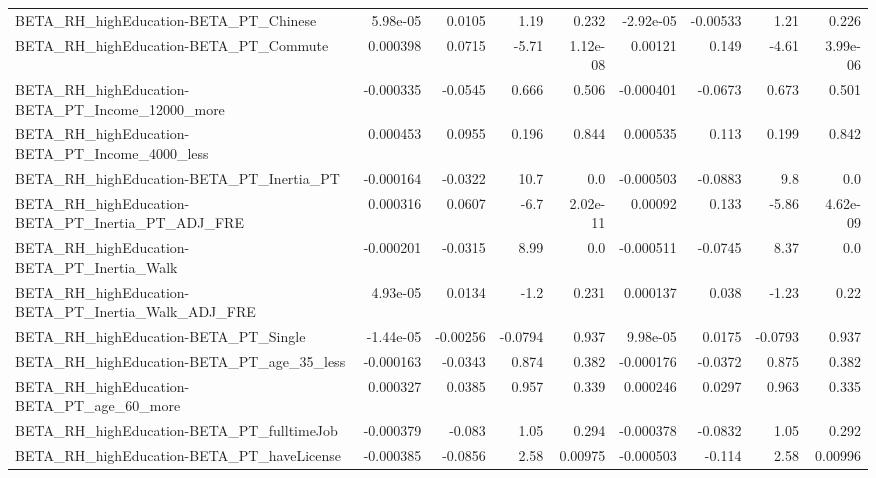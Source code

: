 \begin{tabular}{lrrrrrrrr}
BETA\_RH\_highEducation-BETA\_PT\_Chinese              &    5.98e-05 &       0.0105 &     1.19 &    0.232 &  -2.92e-05 &    -0.00533 &         1.21 &         0.226 \\
BETA\_RH\_highEducation-BETA\_PT\_Commute              &    0.000398 &       0.0715 &    -5.71 & 1.12e-08 &    0.00121 &       0.149 &        -4.61 &      3.99e-06 \\
BETA\_RH\_highEducation-BETA\_PT\_Income\_12000\_more    &   -0.000335 &      -0.0545 &    0.666 &    0.506 &  -0.000401 &     -0.0673 &        0.673 &         0.501 \\
BETA\_RH\_highEducation-BETA\_PT\_Income\_4000\_less     &    0.000453 &       0.0955 &    0.196 &    0.844 &   0.000535 &       0.113 &        0.199 &         0.842 \\
BETA\_RH\_highEducation-BETA\_PT\_Inertia\_PT           &   -0.000164 &      -0.0322 &     10.7 &      0.0 &  -0.000503 &     -0.0883 &          9.8 &           0.0 \\
BETA\_RH\_highEducation-BETA\_PT\_Inertia\_PT\_ADJ\_FRE   &    0.000316 &       0.0607 &     -6.7 & 2.02e-11 &    0.00092 &       0.133 &        -5.86 &      4.62e-09 \\
BETA\_RH\_highEducation-BETA\_PT\_Inertia\_Walk         &   -0.000201 &      -0.0315 &     8.99 &      0.0 &  -0.000511 &     -0.0745 &         8.37 &           0.0 \\
BETA\_RH\_highEducation-BETA\_PT\_Inertia\_Walk\_ADJ\_FRE &    4.93e-05 &       0.0134 &     -1.2 &    0.231 &   0.000137 &       0.038 &        -1.23 &          0.22 \\
BETA\_RH\_highEducation-BETA\_PT\_Single               &   -1.44e-05 &     -0.00256 &  -0.0794 &    0.937 &   9.98e-05 &      0.0175 &      -0.0793 &         0.937 \\
BETA\_RH\_highEducation-BETA\_PT\_age\_35\_less          &   -0.000163 &      -0.0343 &    0.874 &    0.382 &  -0.000176 &     -0.0372 &        0.875 &         0.382 \\
BETA\_RH\_highEducation-BETA\_PT\_age\_60\_more          &    0.000327 &       0.0385 &    0.957 &    0.339 &   0.000246 &      0.0297 &        0.963 &         0.335 \\
BETA\_RH\_highEducation-BETA\_PT\_fulltimeJob          &   -0.000379 &       -0.083 &     1.05 &    0.294 &  -0.000378 &     -0.0832 &         1.05 &         0.292 \\
BETA\_RH\_highEducation-BETA\_PT\_haveLicense          &   -0.000385 &      -0.0856 &     2.58 &  0.00975 &  -0.000503 &      -0.114 &         2.58 &       0.00996 \\

\end{tabular}
